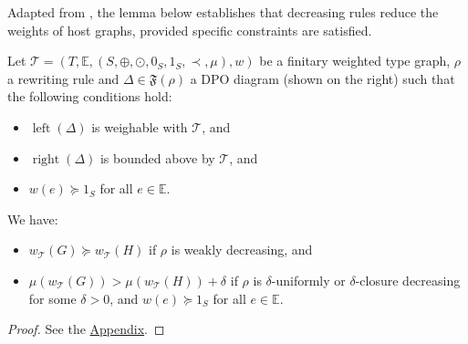 Adapted from \cite[Theorem C.3]{endrullis2024generalized}, the lemma below establishes that decreasing rules reduce the weights of host graphs, provided specific constraints are satisfied.
\begin{lemma}
    \label{lem:decreasing_step}
\newline
\begin{minipage}{0.7\textwidth}
    Let $\mathcal{T} = (T,\mathbb{E}, (S, \oplus, \odot, 0_S, 1_S, \prec, \mu), w)$ be a finitary weighted type graph, $\rho$ a rewriting rule and $\Delta \in \mathfrak{F}(\rho)$ a DPO diagram
    (shown on the right)   such that the following conditions hold:
\end{minipage}  
\begin{minipage}{0.3\textwidth}
    \begin{center}
      \end{center}
\end{minipage}
   \begin{itemize}
       \item $\operatorname{left}(\Delta)$ is weighable with \(\mathcal{T}\), and
       \item $\operatorname{right}(\Delta)$ is bounded above by \(\mathcal{T}\), and
       \item $w(e) \succeq 1_S$ for all $e \in \mathbb{E}$.
   \end{itemize}

   \noindent
  We have:
   \begin{itemize}
       \item $w_\mathcal{T}(G) \succeq w_\mathcal{T}(H)$ if $\rho$ is weakly decreasing, and
       \item $\mu(w_\mathcal{T}(G)) > \mu(w_\mathcal{T}(H)) + \delta$ if $\rho$ is $\delta$-uniformly or $\delta$-closure decreasing for some $\delta >0$, and $w(e) \succeq 1_S$ for all $e \in \mathbb{E}$.
   \end{itemize}
\end{lemma} 
\begin{proof}
   See the \hyperref[proof:decreasing_step]{Appendix}.
\end{proof}